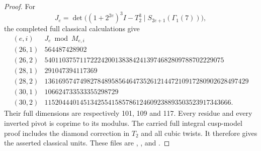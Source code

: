 \documentclass[11pt,a4paper]{article}
\theoremstyle{definition}
\begin{document}
\begin{proof}
For
\[
 J_e=\det\bigl((1+2^{2e})^3I-T_2^3\mid
                         S_{2e+1}(\Gamma_1(7))\bigr),
\]
the completed full classical calculations give
\[
\begin{array}{c|r}
(e,i)&J_e\bmod M_{e,i}\\\hline
(26,1)&564487428902\\
(26,2)&540110375711722242001383842413974682809788702229075\\
(28,1)&291047394117369\\
(28,2)&1361695747498278489585646473526121447210917280902628497429\\
(30,1)&106624733533355298729\\
(30,2)&11520444014513425541585786124609238893503523917343666.
\end{array}                                             \tag{KT-H.5}
\]
Their full dimensions are respectively 101, 109 and 117.
Every residue and every inverted pivot is coprime to its modulus.
The carried full integral cusp-model proof includes the diamond
correction in $T_2$ and all cubic twists.  It therefore gives the
asserted classical units.  These files are
,
, and
.
\end{proof}
\end{document}
